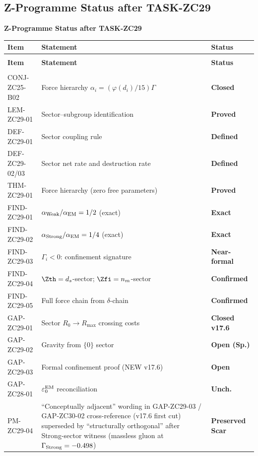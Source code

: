 \documentclass[12pt, a4paper]{article}
\begin{document}
\subsection{Z-Programme Status after TASK-ZC29}
\label{zc29:sec:status}


{\small\color{crfgreen!20!black}\bfseries Z-Programme Status after TASK-ZC29}
\vspace{2pt}

{\small
\setlength{\LTpre}{4pt}
\setlength{\LTpost}{4pt}
\renewcommand{\arraystretch}{1.30}
\begin{longtable}{>{\raggedright\arraybackslash}p{2.5cm}
                  >{\raggedright\arraybackslash}p{7.4cm}
                  >{\centering\arraybackslash}p{1.9cm}}
\toprule
\textbf{Item} & \textbf{Statement} & \textbf{Status} \\
\midrule
\endfirsthead
\multicolumn{3}{l}{\small\textit{(continued)}}\\[4pt]
\toprule
\textbf{Item} & \textbf{Statement} & \textbf{Status} \\
\midrule
\endhead
\midrule
\multicolumn{3}{r}{\small\textit{(continues)}}\\
\endfoot
\bottomrule
\endlastfoot
CONJ-ZC25-B02 & Force hierarchy $\alpha_i=({\varphi(d_i)}/{15})\Gamma$
  & \textbf{Closed}\\
LEM-ZC29-01   & Sector--subgroup identification
  & \textbf{Proved}\\
DEF-ZC29-01   & Sector coupling rule
  & \textbf{Defined}\\
DEF-ZC29-02/03 & Sector net rate and destruction rate
  & \textbf{Defined}\\
THM-ZC29-01   & Force hierarchy (zero free parameters)
  & \textbf{Proved}\\
FIND-ZC29-01  & $\alpha_{\rm Weak}/\alpha_{\rm EM}=1/2$ (exact)
  & \textbf{Exact}\\
FIND-ZC29-02  & $\alpha_{\rm Strong}/\alpha_{\rm EM}
  =1/4$ (exact)
  & \textbf{Exact}\\
FIND-ZC29-03  & $\Gamma_i<0$: confinement signature
  & \textbf{Near-formal}\\
FIND-ZC29-04  & $\Zth=d_s$-sector; $\Zfi=n_m$-sector
  & \textbf{Confirmed}\\
FIND-ZC29-05  & Full force chain from $\delta$-chain
  & \textbf{Confirmed}\\
\midrule
GAP-ZC29-01   & Sector $R_0\!\to\!R_{\max}$ crossing costs
  & \textbf{Closed v17.6}\\
GAP-ZC29-02   & Gravity from $\{0\}$ sector
  & \textbf{Open (Sp.)}\\
GAP-ZC29-03   & Formal confinement proof (NEW v17.6)
  & \textbf{Open}\\
GAP-ZC28-01   & $\varepsilon_0^{\rm EM}$ reconciliation
  & \textbf{Unch.}\\
\midrule
PM-ZC29-04    & ``Conceptually adjacent'' wording in
  GAP-ZC29-03 / GAP-ZC30-02 cross-reference (v17.6 first
  cut) superseded by ``structurally orthogonal'' after
  Strong-sector witness (massless gluon at
  $\Gamma_{\rm Strong}=-0.498$)
  & \textbf{Preserved Scar}\\
\end{longtable}
}
\end{document}

